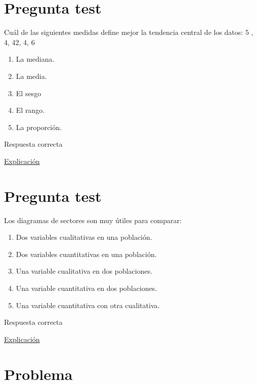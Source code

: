\documentclass[
]{book}
\providecommand{\tightlist}{%
  \setlength{\itemsep}{0pt}\setlength{\parskip}{0pt}}
\begin{document}
\hypertarget{pregunta-test-24}{%
\section{Pregunta test}\label{pregunta-test-24}}

Cuál de las siguientes medidas define mejor la tendencia central de los datos: 5 , 4, 42, 4, 6

\begin{enumerate}
\def\labelenumi{\alph{enumi})}
\tightlist
\item
  La mediana.
\item
  La media.
\item
  El sesgo
\item
  El rango.
\item
  La proporción.
\end{enumerate}

Respuesta correcta

\href{https://1fjmanzano.github.io/bioestadistica/medidas-de-posicio\%CC\%81n-dispersio\%CC\%81n-y-forma.html\#medidas-de-posicio\%CC\%81n-centrales}{Explicación}

\hypertarget{pregunta-test-25}{%
\section{Pregunta test}\label{pregunta-test-25}}

Los diagramas de sectores son muy útiles para comparar:

\begin{enumerate}
\def\labelenumi{\alph{enumi})}
\tightlist
\item
  Dos variables cualitativas en una población.
\item
  Dos variables cuantitativas en una población.
\item
  Una variable cualitativa en dos poblaciones.
\item
  Una variable cuantitativa en dos poblaciones.
\item
  Una variable cuantitativa con otra cualitativa.
\end{enumerate}

Respuesta correcta

\href{https://1fjmanzano.github.io/bioestadistica/diagramas-de-barras-y-sectores.html}{Explicación}

\hypertarget{problema-5}{%
\section{Problema}\label{problema-5}}
\end{document}

